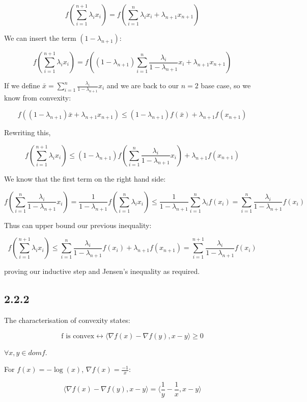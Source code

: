 \documentclass[12pt]{article}
\begin{document}
\[f\left(\sum_{i=1}^{n+1} \lambda_i x_i\right) = f\left(\sum_{i=1}^n \lambda_i x_i + \lambda_{n+1} x_{n+1}\right)\]

We can insert the term $(1-\lambda_{n+1})$:

\[f\left(\sum_{i=1}^{n+1} \lambda_i x_i\right) = f\left((1-\lambda_{n+1}) \sum_{i=1}^n \frac{\lambda_i}{1-\lambda_{n+1}} x_i + \lambda_{n+1} x_{n+1}\right)\]


If we define $\bar{x} = \sum_{i=1}^n \frac{\lambda_i}{1-\lambda_{n+1}} x_i$ and we are back to our $n=2$ base case, so we know from convexity:

\[ f\left((1-\lambda_{n+1})\bar{x} + \lambda_{n+1} x_{n+1}\right) \leq (1-\lambda_{n+1}) f\left( \bar{x}\right) + \lambda_{n+1} f\left( x_{n+1}\right)\]

Rewriting this,

\[f\left(\sum_{i=1}^{n+1} \lambda_i x_i\right) \leq (1-\lambda_{n+1}) f\left( \sum_{i=1}^n \frac{\lambda_i}{1-\lambda_{n+1}} x_i\right) + \lambda_{n+1} f\left( x_{n+1}\right)\]

We know that the first term on the right hand side:

\[f\left( \sum_{i=1}^n \frac{\lambda_i}{1-\lambda_{n+1}} x_i\right) = \frac{1}{{1-\lambda_{n+1}}}f\left( \sum_{i=1}^n \lambda_i x_i\right) \leq \frac{1}{{1-\lambda_{n+1}}} \sum_{i=1}^n \lambda_i f \left(x_i\right) =  \sum_{i=1}^n \frac{\lambda_i}{{1-\lambda_{n+1}}}  f \left(x_i\right)\]

Thus can upper bound our previous inequality:


\[f\left(\sum_{i=1}^{n+1} \lambda_i x_i\right)  \leq \sum_{i=1}^n \frac{\lambda_i}{{1-\lambda_{n+1}}}  f \left(x_i\right) + \lambda_{n+1} f\left( x_{n+1}\right) =\sum_{i=1}^{n+1} \frac{\lambda_i}{{1-\lambda_{n+1}}} f \left(x_i\right) \]

proving our inductive step and Jensen's inequality as required. \square


\subsection*{2.2.2}
The characterisation of convexity states:

\[\text{f is convex} \leftrightarrow \langle \nabla f(x) - \nabla f(y), x-y \rangle \geq 0\]

$\forall x, y \in dom f$.

For $f(x) = -\log(x)$, $\nabla f(x) = \frac{-1}{x}$:

\[\langle \nabla f(x) - \nabla f(y), x-y \rangle = \langle \frac{1}{y}-\frac{1}{x}, x-y \rangle\]
\end{document}
